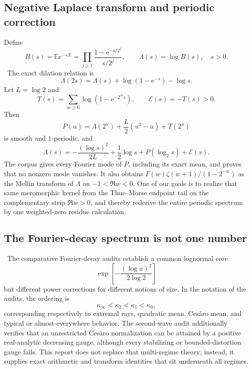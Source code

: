 \documentclass[11pt]{article}
\numberwithin{equation}{section}
\theoremstyle{definition}
\theoremstyle{remark}
\newcommand{\E}{\mathbb E}
\newcommand{\e}{\mathrm e}
\begin{document}
\subsection{Negative Laplace transform and periodic correction}
Define
\begin{equation}
 B(s)=\E\e^{-sX}
 =\prod_{j\ge1}\frac{1-\e^{-s/2^j}}{s/2^j},
 \qquad \Lambda(s)=\log B(s),\quad s>0.                   \label{p9:eq:B}
\end{equation}
\statusE\ The exact dilation relation is
\begin{equation}
 \Lambda(2s)=\Lambda(s)+\log(1-\e^{-s})-\log s.           \label{p9:eq:Lambda-dilation}
\end{equation}
Let $L=\log2$ and
\begin{equation}
 T(s)=\sum_{m\ge0}\log(1-\e^{-2^ms}),\qquad
 \mathcal E(s)=-T(s)>0.                                   \label{p9:eq:E-tail}
\end{equation}
Then
\begin{equation}
 P(u)=\Lambda(2^u)+\frac L2(u^2-u)+T(2^u)                 \label{p9:eq:P-def}
\end{equation}
is smooth and $1$-periodic, and
\begin{equation}
 \boxed{\Lambda(s)=-\frac{(\log s)^2}{2L}+\frac12\log s
 +P(\log_2s)+\mathcal E(s).}                              \label{p9:eq:Lambda-periodic}
\end{equation}
The corpus gives every Fourier mode of $P$, including its exact mean, and proves that no
nonzero mode vanishes.  It also obtains
$\Gamma(w)\zeta(w+1)/(1-2^{-w})$ as the Mellin transform of $\Lambda$ on
$-1<\Re w<0$.  One of our goals is to realize that same meromorphic kernel from the
Thue--Morse endpoint tail on the complementary strip $\Re w>0$, and thereby rederive the
entire periodic spectrum by one weighted-zero residue calculation.

\subsection{The Fourier-decay spectrum is not one number}
\statusE\ The comparative Fourier-decay audits establish a common lognormal core
\[
 \exp\!\left[-\frac{(\log x)^2}{2\log2}\right]
\]
but different power corrections for different notions of size.  In the notation of the
audits, the ordering is
\[
 \kappa_\infty<\kappa_2<\kappa_1<\kappa_0,
\]
corresponding respectively to extremal rays, quadratic mean, Ces\`aro mean, and typical or
almost-everywhere behavior.  The second-wave audit additionally verifies that an
unrestricted Ces\`aro normalization can be attained by a positive real-analytic decreasing
gauge, although every stabilizing or bounded-distortion gauge fails.  This report does not
replace that multi-regime theory; instead, it supplies exact arithmetic and transform
identities that sit underneath all regimes.
\end{document}
